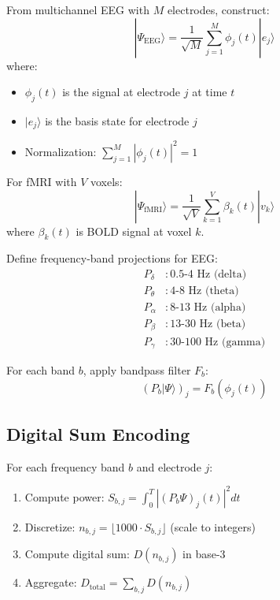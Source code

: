 \begin{definition}\label{def:clinical-state}
From multichannel EEG with $M$ electrodes, construct:
\begin{equation}
|\Psi_{\text{EEG}}\rangle = \frac{1}{\sqrt{M}} \sum_{j=1}^{M} \phi_j(t) |e_j\rangle
\end{equation}
where:
\begin{itemize}
\item $\phi_j(t)$ is the signal at electrode $j$ at time $t$
\item $|e_j\rangle$ is the basis state for electrode $j$
\item Normalization: $\sum_{j=1}^{M} |\phi_j(t)|^2 = 1$
\end{itemize}
\end{definition}

For fMRI with $V$ voxels:
\begin{equation}
|\Psi_{\text{fMRI}}\rangle = \frac{1}{\sqrt{V}} \sum_{k=1}^{V} \beta_k(t) |v_k\rangle
\end{equation}
where $\beta_k(t)$ is BOLD signal at voxel $k$.

\begin{proposition}\label{prop:projection-clinical}
Define frequency-band projections for EEG:
\begin{align}
P_{\delta} &: 0.5\text{-}4\text{ Hz (delta)} \\
P_{\theta} &: 4\text{-}8\text{ Hz (theta)} \\
P_{\alpha} &: 8\text{-}13\text{ Hz (alpha)} \\
P_{\beta} &: 13\text{-}30\text{ Hz (beta)} \\
P_{\gamma} &: 30\text{-}100\text{ Hz (gamma)}
\end{align}

For each band $b$, apply bandpass filter $F_b$:
\begin{equation}
(P_b |\Psi\rangle)_j = F_b(\phi_j(t))
\end{equation}
\end{proposition}

\subsection{Digital Sum Encoding}

\begin{construction}\label{const:neural-digital-sum}
For each frequency band $b$ and electrode $j$:
\begin{enumerate}
\item Compute power: $S_{b,j} = \int_0^T |(P_b \Psi)_j(t)|^2 dt$
\item Discretize: $n_{b,j} = \lfloor 1000 \cdot S_{b,j} \rfloor$ (scale to integers)
\item Compute digital sum: $D(n_{b,j})$ in base-3
\item Aggregate: $D_{\text{total}} = \sum_{b,j} D(n_{b,j})$
\end{enumerate}
\end{construction}

